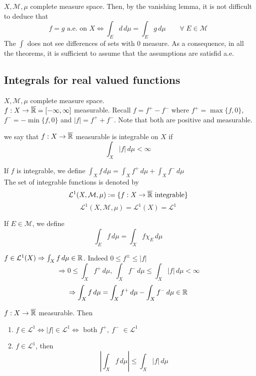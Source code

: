\begin{remark}
    \(X, \mathcal{M}, \mu\) complete measure space. Then, by the vanishing lemma, it is not difficult to deduce that 
    \[
        f=g \text{ a.e. on } X \iff \int_E d \, d\mu = \int_E g \, d\mu \qquad \forall\; E \in \mathcal{M}
    \]
    The \(\int\) does not see differences of sets with 0 measure. As a consequence, in all the theorems, it is sufficient to assume that the assumptions are satisfid a.e. 
\end{remark}


\subsection*{Integrals for real valued functions}
\(X, \mathcal{M}, \mu\) complete measure space. \\
\(f: X \to \overline{\mathbb{R}} = [-\infty, \infty]\) measurable. Recall \(f= f^+ - f^- \) where \(f^+ = \max{\{f, 0\}}\), \(f^- = -\min{\{f, 0\}} \) and \(|f|= f^+ + f^-\). 
Note that both are positive and measurable. 

\begin{definition}
    we say that \(f:X \to \overline{\mathbb{R}}\) measurable is integrable on \(X\) if 
    \[
        \int_X |f| \, d\mu < \infty
    \]
\end{definition}

If \(f\) is integrable, we define \(\int_X f \, d\mu = \int_X f^+ \, d\mu + \int_X f^- \, d\mu\) \\
The set of integrable functions is denoted by 
\[
    \mathcal{L}^1 (X, \mathcal{M}, \mu) := \{f:X \to \overline{\mathbb{R}} \text{ integrable} \} 
\]
\[
    \mathcal{L}^1 (X, \mathcal{M}, \mu) 
    = \mathcal{L}^1 (X) 
    = \mathcal{L}^1 
\]

If \(E \in \mathcal{M}\), we define
\[
    \int_E f \, d\mu = \int_X f \chi_E \, d\mu
\]

\begin{remark}
    \(f \in \mathcal{L}^1(X) \Rightarrow \int_X f \, d\mu \in \mathbb{R}\). Indeed \(0 \leq f^\pm \leq |f|\)
    \[
        \Rightarrow 0 \leq \int_X f^+ \, d\mu ,\ \int_X f^- \, d\mu \leq \int_X |f| \, d\mu < \infty 
    \] 
    \[
        \Rightarrow \int_X f \, d\mu = \int_X f^+ \, d\mu - \int_X f^- \, d\mu \in \mathbb{R}
    \]
\end{remark}

\begin{proposition}
    \(f : X \to \overline{\mathbb{R}} \) measurable. Then
    \begin{enumerate}
        \item \(f \in \mathcal{L}^1 \iff |f| \in \mathcal{L}^1 \iff \) both \(f^+, \ f^-\) \(\in \mathcal{L}^1\)
        \item \(f \in \mathcal{L}^1 \), then 
        \[
            \left| \int_X f \, d\mu \right| \leq \int_X |f| \, d\mu  \tag{triangle inequality}
        \]
    \end{enumerate}
\end{proposition}


